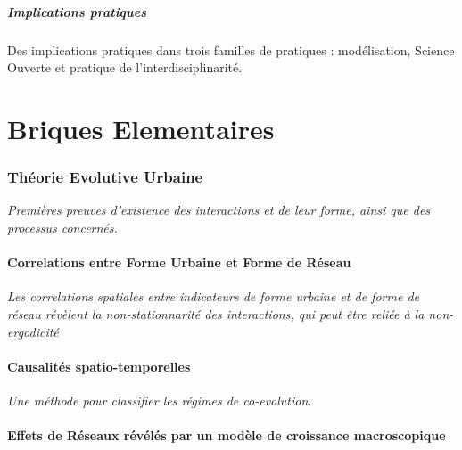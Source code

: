\subsubsection*{Implications pratiques}

Des implications pratiques dans trois familles de pratiques : modélisation, Science Ouverte et pratique de l'interdisciplinarité.












\part{Briques Elementaires}



\section{Théorie Evolutive Urbaine}

\textit{Premières preuves d'existence des interactions et de leur forme, ainsi que des processus concernés.}

\subsection{Correlations entre Forme Urbaine et Forme de Réseau}

\textit{Les correlations spatiales entre indicateurs de forme urbaine et de forme de réseau révèlent la non-stationnarité des interactions, qui peut être reliée à la non-ergodicité}


\subsection{Causalités spatio-temporelles}


\textit{Une méthode pour classifier les régimes de co-evolution.}


\subsection{Effets de Réseaux révélés par un modèle de croissance macroscopique}


